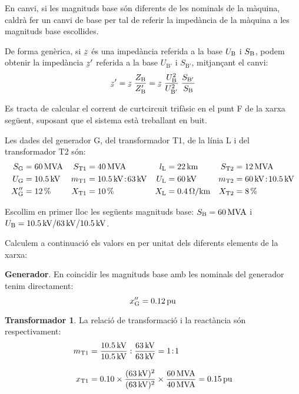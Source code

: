  En canvi, si les magnituds base són diferents de les nominals de la màquina, caldrà fer un canvi de base per tal de referir la impedància de la màquina a les magnituds base escollides.

De forma genèrica, si $\cmplx{z}$ és una impedància referida a la base $U_\mathrm{B}$ i $S_\mathrm{B}$, podem obtenir la impedància $\cmplx{z}'$ referida a la base $U_{\text{B}'}$ i $S_{\text{B}'}$, mitjançant el canvi:
\begin{equation}
   \cmplx{z}' = \cmplx{z} \; \frac{Z\ped{B}}{Z\ped{B}'} = \cmplx{z} \; \frac{U\ped{B}^2}{U_{\text{B}'}^2} \; \frac{S_{\text{B}'}}{S\ped{B}}\label{eq_pu_canvi_base}
\end{equation}


\begin{exemple}[\MetodeCalculPU{}]
	\addcontentsxms{\MetodeCalculPU}
    Es tracta de calcular el corrent de curtcircuit trifàsic en el punt F de la xarxa següent, suposant
    que el sistema està treballant en buit.
    \begin{center}
        
    \end{center}

    Les dades del generador G, del transformador T1, de la línia L i del transformador T2 són:
    \begin{align*}
       S_\mathrm{G} &= \qty{60}{MVA} & S_\mathrm{T1} &= \qty{40}{MVA} & l_\mathrm{L} &= \qty{22}{km} & S_\mathrm{T2} &=
       \qty{12}{MVA} \\
       U_\mathrm{G} &= \qty{10,5}{kV} & m_\mathrm{T1} &= \qty{10,5}{kV}\!:\!\qty{63}{kV} & U_\mathrm{L} &= \qty{60}{kV} & m_\mathrm{T2} &= \qty{60}{kV}\!:\!\qty{10,5}{kV} \\
       X''_\mathrm{G} &= \qty{12}{\percent} & X_\mathrm{T1} &= \qty{10}{\percent} & X_\mathrm{L} &= \qty{0,4}{\ohm/km} & X_\mathrm{T2} &= \qty{8}{\percent}
    \end{align*}

    Escollim en primer lloc les següents magnituds base: $S_\mathrm{B} = \qty{60}{MVA}$ i $U_\mathrm{B}
    = \qty{10,5}{kV} / \qty{63}{kV} / \qty{10,5}{kV}$.

    Calculem a continuació els valors en per unitat dels diferents elements de la xarxa:

    \textbf{Generador}. En coincidir les magnituds base amb les nominals del generador tenim
     directament:
    \[
    x''_\mathrm{G} = \qty{0,12}{pu}
    \]

    \textbf{Transformador 1}. La relació de transformació i la reactància són respectivament:
    \begin{align*}
    m_\mathrm{T1} &= \frac{\qty{10,5}{kV}}{\qty{10,5}{kV}} :
    \frac{\qty{63}{kV}}{\qty{63}{kV}} = 1\!:\!1 \\[3mm]
    x_\mathrm{T1} &= \num{0,10} \times \frac{(\qty{63}{kV})^2}{(\qty{63}{kV})^2} \times
    \frac{\qty{60}{MVA}}{\qty{40}{MVA}}  = \qty{0,15}{pu}
    \end{align*}


\end{exemple}
